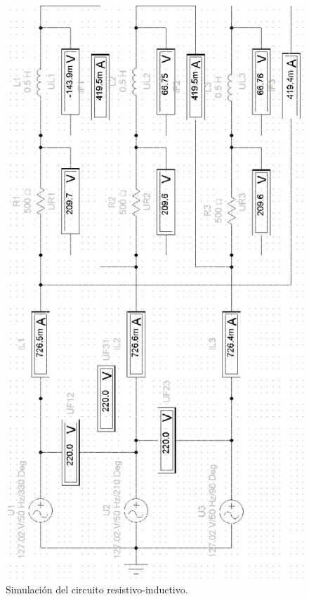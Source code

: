 \documentclass[letter,11pt]{article}
\begin{document}
\begin{figure}[!h]
\centering
\includegraphics[scale=1.08]{simulacion/practica2.2.eps}
\caption{Simulación del circuito resistivo-inductivo.}
\label{simulacion2}
\end{figure}
\end{document}
